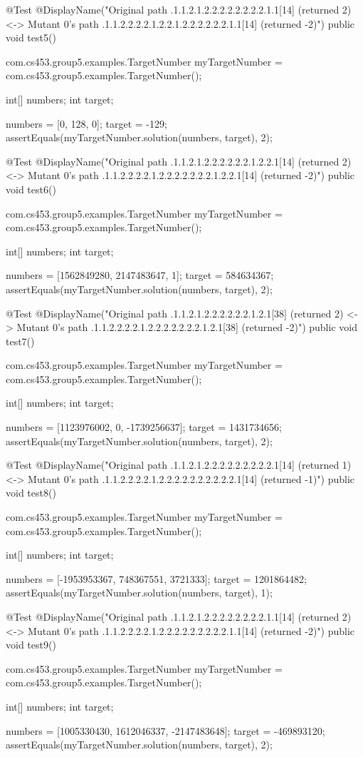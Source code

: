@Test
@DisplayName("Original path .1.1.2.1.2.2.2.2.2.2.2.2.1.1[14] (returned 2) <-> Mutant 0's path .1.1.2.2.2.2.1.2.2.1.2.2.2.2.2.2.1.1[14] (returned -2)")
public void test5() {
    com.cs453.group5.examples.TargetNumber myTargetNumber = com.cs453.group5.examples.TargetNumber();

    int[] numbers;
    int target;

    numbers = [0, 128, 0];
    target = -129;
    assertEquals(myTargetNumber.solution(numbers, target), 2);
}

@Test
@DisplayName("Original path .1.1.2.1.2.2.2.2.2.2.1.2.2.1[14] (returned 2) <-> Mutant 0's path .1.1.2.2.2.2.1.2.2.2.2.2.2.2.1.2.2.1[14] (returned -2)")
public void test6() {
    com.cs453.group5.examples.TargetNumber myTargetNumber = com.cs453.group5.examples.TargetNumber();

    int[] numbers;
    int target;

    numbers = [1562849280, 2147483647, 1];
    target = 584634367;
    assertEquals(myTargetNumber.solution(numbers, target), 2);
}

@Test
@DisplayName("Original path .1.1.2.1.2.2.2.2.2.2.1.2.1[38] (returned 2) <-> Mutant 0's path .1.1.2.2.2.2.1.2.2.2.2.2.2.2.1.2.1[38] (returned -2)")
public void test7() {
    com.cs453.group5.examples.TargetNumber myTargetNumber = com.cs453.group5.examples.TargetNumber();

    int[] numbers;
    int target;

    numbers = [1123976002, 0, -1739256637];
    target = 1431734656;
    assertEquals(myTargetNumber.solution(numbers, target), 2);
}

@Test
@DisplayName("Original path .1.1.2.1.2.2.2.2.2.2.2.2.2.1[14] (returned 1) <-> Mutant 0's path .1.1.2.2.2.2.1.2.2.2.2.2.2.2.2.2.2.1[14] (returned -1)")
public void test8() {
    com.cs453.group5.examples.TargetNumber myTargetNumber = com.cs453.group5.examples.TargetNumber();

    int[] numbers;
    int target;

    numbers = [-1953953367, 748367551, 3721333];
    target = 1201864482;
    assertEquals(myTargetNumber.solution(numbers, target), 1);
}

@Test
@DisplayName("Original path .1.1.2.1.2.2.2.2.2.2.2.2.1.1[14] (returned 2) <-> Mutant 0's path .1.1.2.2.2.2.1.2.2.2.2.2.2.2.2.2.1.1[14] (returned -2)")
public void test9() {
    com.cs453.group5.examples.TargetNumber myTargetNumber = com.cs453.group5.examples.TargetNumber();

    int[] numbers;
    int target;

    numbers = [1005330430, 1612046337, -2147483648];
    target = -469893120;
    assertEquals(myTargetNumber.solution(numbers, target), 2);
}

